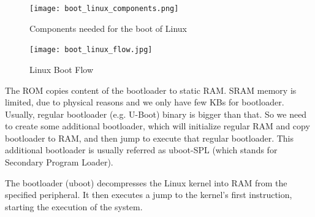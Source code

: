 \begin{figure}[H]
    \centering
    \texttt{[image: boot\_linux\_components.png]}
    \caption{Components needed for the boot of Linux}
\end{figure}

\begin{figure}[H]
    \centering
    \texttt{[image: boot\_linux\_flow.jpg]}
    \caption{Linux Boot Flow}
\end{figure}

The ROM copies content of the bootloader to static RAM. SRAM memory is limited,
due to physical reasons and we only have few KBs for bootloader.
Usually, regular bootloader (e.g. U-Boot) binary is bigger than that.
So we need to create some additional bootloader, which will initialize regular
RAM and copy bootloader to RAM, and then jump to execute that regular
bootloader. This additional bootloader is usually referred as uboot-SPL
(which stands for Secondary Program Loader).

The bootloader (uboot) decompresses the Linux kernel into RAM from the
specified peripheral. It then executes a jump to the kernel's first
instruction, starting the execution of the system.



